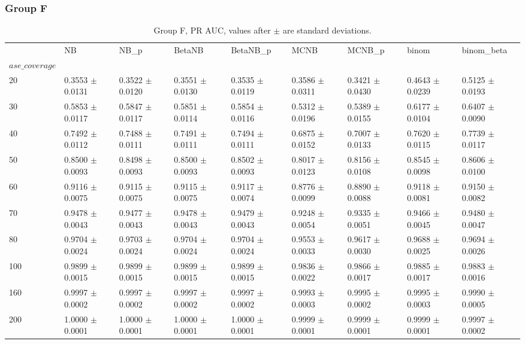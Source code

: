 \subsubsection*{Group F}
\begin{table}[H]
\centering
\begin{adjustbox}{max width=\linewidth}
\begin{tabular}{lllllllll}
\toprule
 & NB & NB\_p & BetaNB & BetaNB\_p & MCNB & MCNB\_p & binom & binom\_beta \\
$ase\_coverage$ &  &  &  &  &  &  &  &  \\
\midrule
20 & 0.3553 $\pm$ 0.0131 & 0.3522 $\pm$ 0.0120 & 0.3551 $\pm$ 0.0130 & 0.3535 $\pm$ 0.0119 & 0.3586 $\pm$ 0.0311 & 0.3421 $\pm$ 0.0430 & 0.4643 $\pm$ 0.0239 & 0.5125 $\pm$ 0.0193 \\
30 & 0.5853 $\pm$ 0.0117 & 0.5847 $\pm$ 0.0117 & 0.5851 $\pm$ 0.0114 & 0.5854 $\pm$ 0.0116 & 0.5312 $\pm$ 0.0196 & 0.5389 $\pm$ 0.0155 & 0.6177 $\pm$ 0.0104 & 0.6407 $\pm$ 0.0090 \\
40 & 0.7492 $\pm$ 0.0112 & 0.7488 $\pm$ 0.0111 & 0.7491 $\pm$ 0.0111 & 0.7494 $\pm$ 0.0111 & 0.6875 $\pm$ 0.0152 & 0.7007 $\pm$ 0.0133 & 0.7620 $\pm$ 0.0115 & 0.7739 $\pm$ 0.0117 \\
50 & 0.8500 $\pm$ 0.0093 & 0.8498 $\pm$ 0.0093 & 0.8500 $\pm$ 0.0093 & 0.8502 $\pm$ 0.0093 & 0.8017 $\pm$ 0.0123 & 0.8156 $\pm$ 0.0108 & 0.8545 $\pm$ 0.0098 & 0.8606 $\pm$ 0.0100 \\
60 & 0.9116 $\pm$ 0.0075 & 0.9115 $\pm$ 0.0075 & 0.9115 $\pm$ 0.0075 & 0.9117 $\pm$ 0.0074 & 0.8776 $\pm$ 0.0099 & 0.8890 $\pm$ 0.0088 & 0.9118 $\pm$ 0.0081 & 0.9150 $\pm$ 0.0082 \\
70 & 0.9478 $\pm$ 0.0043 & 0.9477 $\pm$ 0.0043 & 0.9478 $\pm$ 0.0043 & 0.9479 $\pm$ 0.0043 & 0.9248 $\pm$ 0.0054 & 0.9335 $\pm$ 0.0051 & 0.9466 $\pm$ 0.0045 & 0.9480 $\pm$ 0.0047 \\
80 & 0.9704 $\pm$ 0.0024 & 0.9703 $\pm$ 0.0024 & 0.9704 $\pm$ 0.0024 & 0.9704 $\pm$ 0.0024 & 0.9553 $\pm$ 0.0033 & 0.9617 $\pm$ 0.0030 & 0.9688 $\pm$ 0.0025 & 0.9694 $\pm$ 0.0026 \\
100 & 0.9899 $\pm$ 0.0015 & 0.9899 $\pm$ 0.0015 & 0.9899 $\pm$ 0.0015 & 0.9899 $\pm$ 0.0015 & 0.9836 $\pm$ 0.0022 & 0.9866 $\pm$ 0.0017 & 0.9885 $\pm$ 0.0017 & 0.9883 $\pm$ 0.0016 \\
160 & 0.9997 $\pm$ 0.0002 & 0.9997 $\pm$ 0.0002 & 0.9997 $\pm$ 0.0002 & 0.9997 $\pm$ 0.0002 & 0.9993 $\pm$ 0.0003 & 0.9995 $\pm$ 0.0002 & 0.9995 $\pm$ 0.0003 & 0.9990 $\pm$ 0.0005 \\
200 & 1.0000 $\pm$ 0.0001 & 1.0000 $\pm$ 0.0001 & 1.0000 $\pm$ 0.0001 & 1.0000 $\pm$ 0.0001 & 0.9999 $\pm$ 0.0001 & 0.9999 $\pm$ 0.0001 & 0.9999 $\pm$ 0.0001 & 0.9997 $\pm$ 0.0002 \\
\bottomrule
\end{tabular}

\end{adjustbox}
\caption{Group F, PR AUC, values after $\pm$ are standard deviations.}
\end{table}

